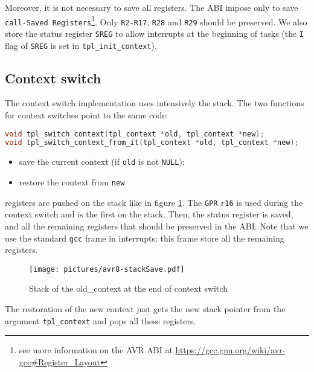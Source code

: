 Moreover, it is not necessary to save all registers. The ABI impose only to save \texttt{call-Saved Registers}\footnote{see more information on the AVR ABI at \url{https://gcc.gnu.org/wiki/avr-gcc\#Register\_Layout}}. Only \texttt{R2-R17}, \texttt{R28} and \texttt{R29} should be preserved. We also store the status register \texttt{SREG} to allow interrupts at the beginning of tasks (the \texttt{I} flag of \texttt{SREG} is set in \texttt{tpl_init_context}).

\subsection{Context switch}
The context switch implementation uses intensively the stack. The two functions for context switches point to the same code:

\begin{lstlisting}[language=C]
void tpl_switch_context(tpl_context *old, tpl_context *new);
void tpl_switch_context_from_it(tpl_context *old, tpl_context *new);
\end{lstlisting}

\begin{itemize}
\item save the current context (if \texttt{old} is not \texttt{NULL});
\item restore the context from \texttt{new}
\end{itemize}

registers are pushed on the stack like in figure \ref{fig:avr8-stackSave}. The \texttt{GPR} \texttt{r16} is used during the context switch and is the first on the stack. Then, the status register is saved, and all the remaining registers that should be preserved in the ABI. Note that we use the standard \texttt{gcc} frame in interrupts; this frame store all the remaining registers.

\begin{figure}[htbp] %
\begin{minipage}{0.4\textwidth}
    \centering
  \texttt{[image: pictures/avr8-stackSave.pdf]} 
\end{minipage}
\begin{minipage}{0.6\textwidth}
  \caption{Stack of the old_context at the end of context switch}\label{fig:avr8-stackSave}
\end{minipage}
\end{figure}

The restoration of the new context just gets the new stack pointer from the argument \texttt{tpl_context} and pops all these registers.


